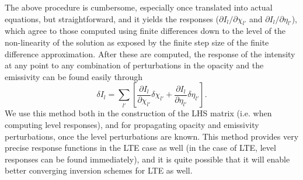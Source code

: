 \documentclass[referee]{aa}
\begin{document}
The above procedure is cumbersome, especially once translated into actual equations, but straightforward, and it yields the responses ($\partial I_{l}/\partial \chi_{l'}$ and $\partial I_{l}/\partial \eta_{l'}$), which agree to those computed using finite differences down to the level of the non-linearity of the solution as exposed by the finite step size of the finite difference approximation. After these are computed, the response of the intensity at any point to any combination of perturbations in the opacity and the emissivity can be found easily through
\begin{equation}
 \delta I_l = \sum_{l'} \left [ \frac{\partial I_l}{\partial \chi_{l'}} \delta \chi_{l'} + \frac{\partial I_l}{\partial \eta_{l'}} \delta \eta_{l'} \right ].
\end{equation}
We use this method both in the construction of the LHS matrix (i.e. when computing level responses), and for propagating opacity and emissivity perturbations, once the level perturbations are known. This method provides very precise response functions in the LTE case as well (in the case of LTE, level responses can be found immediately), and it is quite possible that it will enable better converging inversion schemes for LTE as well.


\end{document}
